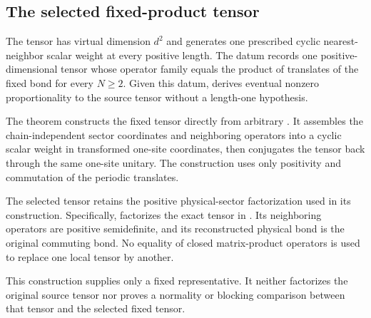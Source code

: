 \documentclass{article}
\begin{document}
\subsection{The selected fixed-product tensor}

The tensor  has virtual dimension
$d^2$ and generates one prescribed cyclic nearest-neighbor scalar weight at
every positive length. The datum
records one positive-dimensional tensor whose operator family equals the
product of translates of the fixed bond for every $N\geq2$. Given this datum,
derives eventual nonzero proportionality to the source tensor without a
length-one hypothesis.

The theorem
constructs the fixed tensor directly from arbitrary
. It assembles the
chain-independent sector coordinates and neighboring operators into a cyclic
scalar weight in transformed one-site coordinates, then conjugates the tensor
back through the same one-site unitary. The construction uses only positivity
and commutation of the periodic translates.

The selected tensor retains the positive physical-sector factorization used
in its construction. Specifically,
factorizes the exact tensor in
.
Its neighboring operators are positive semidefinite, and its reconstructed
physical bond is the original commuting bond. No equality of closed
matrix-product operators is used to replace one local tensor by another.

This construction supplies only a fixed representative. It neither factorizes
the original source tensor nor proves a normality or blocking comparison
between that tensor and the selected fixed tensor.
\end{document}
